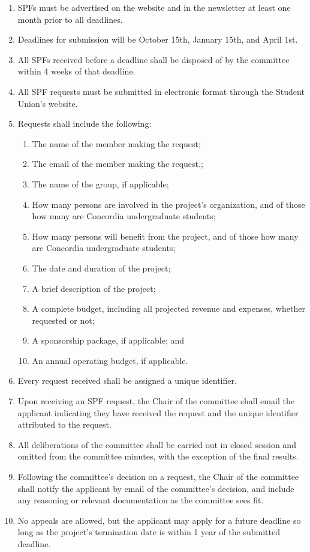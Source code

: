 \documentclass[oneside]{book}
\begin{document}
\begin{enumerate}
\item SPFs must be advertised on the website and in the newsletter at least one month prior to all deadlines.
\item Deadlines for submission will be October 15th, January 15th, and April 1st.
\item All SPFs received before a deadline shall be disposed of by the committee within 4 weeks of that deadline. 
\item All SPF requests must be submitted in electronic format through the Student Union’s website.
\item Requests shall include the following:
	\begin{enumerate}
	\item The name of the member making the request;
	\item The email of the member making the request.;
	\item The name of the group, if applicable;
	\item How many persons are involved in the project’s organization, and of those how many are Concordia undergraduate students;
	\item How many persons will benefit from the project, and of those how many are Concordia undergraduate students;
	\item The date and duration of the project;
	\item A brief description of the project;
	\item A complete budget, including all projected revenue and expenses, whether requested or not;
	\item A sponsorship package, if applicable; and
	\item An annual operating budget, if applicable.
	\end{enumerate}
\item Every request received shall be assigned a unique identifier.
\item Upon receiving an SPF request, the Chair of the committee shall email the applicant indicating they have received the request and the unique identifier attributed to the request.
\item All deliberations of the committee shall be carried out in closed session and omitted from the committee minutes, with the exception of the final results. 
\item Following the committee’s decision on a request, the Chair of the committee shall notify the applicant by email of the committee’s decision, and include any reasoning or relevant documentation as the committee sees fit. 
\item No appeals are allowed, but the applicant may apply for a future deadline so long as the project’s termination date is within 1 year of the submitted deadline.


\end{enumerate}
\end{document}
